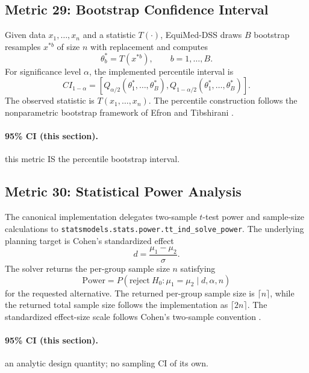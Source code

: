 \documentclass[11pt]{article}
\begin{document}
\subsection{Metric 29: Bootstrap Confidence Interval}

Given data $x_1,\ldots,x_n$ and a statistic $T(\cdot)$, EquiMed-DSS draws
$B$ bootstrap resamples $x^{\ast b}$ of size $n$ with replacement and computes
\begin{equation}
\theta_b^\ast=T(x^{\ast b}),\qquad b=1,\ldots,B.
\end{equation}
For significance level $\alpha$, the implemented percentile interval is
\begin{equation}
CI_{1-\alpha}=
\left[
Q_{\alpha/2}(\theta_1^\ast,\ldots,\theta_B^\ast),
Q_{1-\alpha/2}(\theta_1^\ast,\ldots,\theta_B^\ast)
\right].
\end{equation}
The observed statistic is $T(x_1,\ldots,x_n)$. The percentile construction
follows the nonparametric bootstrap framework of Efron and Tibshirani
\cite{efron1979,efron1993}.


\paragraph{95\% CI (this section).} this metric IS the percentile bootstrap interval.

\subsection{Metric 30: Statistical Power Analysis}

The canonical implementation delegates two-sample $t$-test power and sample-size
calculations to \texttt{statsmodels.stats.power.tt\_ind\_solve\_power}. The
underlying planning target is Cohen's standardized effect
\begin{equation}
d=\frac{\mu_1-\mu_2}{\sigma}.
\end{equation}
The solver returns the per-group sample size $n$ satisfying
\begin{equation}
\mathrm{Power}=
P\left(\mathrm{reject}\ H_0:\mu_1=\mu_2\mid d,\alpha,n\right)
\end{equation}
for the requested alternative. The returned per-group sample size is
$\lceil n\rceil$, while the returned total sample size follows the implementation
as $\lceil 2n\rceil$. The standardized effect-size scale follows Cohen's
two-sample convention \cite{cohen1988}.


\paragraph{95\% CI (this section).} an analytic design quantity; no sampling CI of its own.
\end{document}
